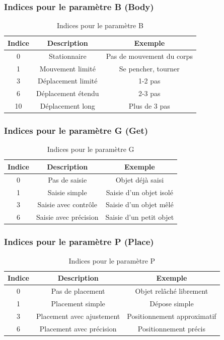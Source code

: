 \documentclass[a4paper,12pt]{article}
\begin{document}
\subsubsection{Indices pour le paramètre B (Body)}

\begin{table}[ht]
\centering
\begin{tabular}{|c|c|c|}
\hline
\textbf{Indice} & \textbf{Description} & \textbf{Exemple} \\
\hline
0 & Stationnaire & Pas de mouvement du corps \\
1 & Mouvement limité & Se pencher, tourner \\
3 & Déplacement limité & 1-2 pas \\
6 & Déplacement étendu & 2-3 pas \\
10 & Déplacement long & Plus de 3 pas \\
\hline
\end{tabular}
\caption{Indices pour le paramètre B}
\end{table}

\subsubsection{Indices pour le paramètre G (Get)}

\begin{table}[ht]
\centering
\begin{tabular}{|c|c|c|}
\hline
\textbf{Indice} & \textbf{Description} & \textbf{Exemple} \\
\hline
0 & Pas de saisie & Objet déjà saisi \\
1 & Saisie simple & Saisie d'un objet isolé \\
3 & Saisie avec contrôle & Saisie d'un objet mêlé \\
6 & Saisie avec précision & Saisie d'un petit objet \\
\hline
\end{tabular}
\caption{Indices pour le paramètre G}
\end{table}

\subsubsection{Indices pour le paramètre P (Place)}

\begin{table}[ht]
\centering
\begin{tabular}{|c|c|c|}
\hline
\textbf{Indice} & \textbf{Description} & \textbf{Exemple} \\
\hline
0 & Pas de placement & Objet relâché librement \\
1 & Placement simple & Dépose simple \\
3 & Placement avec ajustement & Positionnement approximatif \\
6 & Placement avec précision & Positionnement précis \\
\hline
\end{tabular}
\caption{Indices pour le paramètre P}
\end{table}
\end{document}
